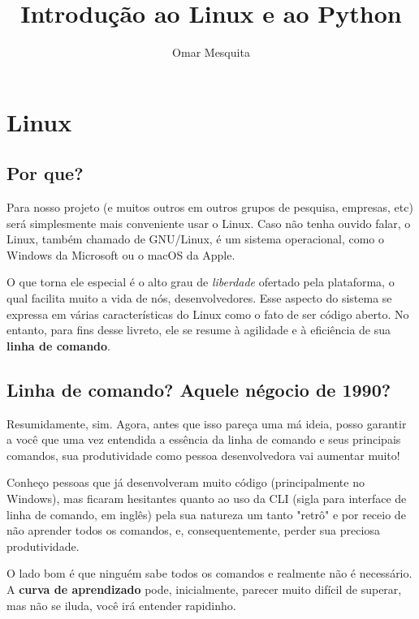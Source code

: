 \documentclass{article}
\begin{document}
	\title{Introdução ao Linux e ao Python}
	\date{}
	\author{Omar Mesquita}
	\maketitle
	
	\newpage
	\tableofcontents
	\newpage

	\section{Linux}
	\subsection{Por que?}
	
	Para nosso projeto (e muitos outros em outros grupos de pesquisa, empresas, etc) será simplesmente mais conveniente 
	usar o Linux. Caso não tenha ouvido falar, o Linux, também chamado de GNU/Linux, é um sistema operacional, como o 
	Windows da Microsoft ou o macOS da Apple. 


	O que torna ele especial é o alto grau de \textit{liberdade} ofertado pela plataforma, o qual facilita muito a vida de nós, 
	desenvolvedores. Esse aspecto do sistema se expressa em várias características do Linux como o fato de ser código aberto. 
	No entanto, para fins desse livreto, ele se resume à agilidade e à eficiência de sua \textbf{linha de comando}.

	\subsection{Linha de comando? Aquele négocio de 1990?} 

	Resumidamente, sim. Agora, antes que isso pareça uma má ideia, posso garantir a você que uma vez entendida a essência da
	linha de comando e seus principais comandos, sua produtividade como pessoa desenvolvedora vai aumentar muito! 

	Conheço pessoas que já desenvolveram muito código (principalmente no Windows), 
	mas ficaram hesitantes quanto ao uso da CLI (sigla para interface de linha de comando, em inglês) 
	pela sua natureza um tanto "retrô" e por receio de não aprender todos os comandos, e,
	consequentemente, perder sua preciosa produtividade. 

	O lado bom é que ninguém sabe todos os comandos e realmente não é necessário. A \textbf{curva de aprendizado} pode, 
	inicialmente, parecer muito difícil de superar, mas não se iluda, você irá entender rapidinho. 
\end{document}
